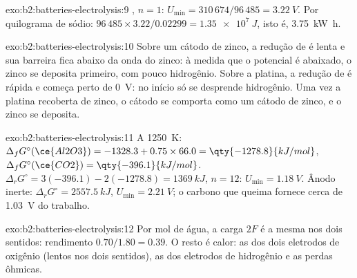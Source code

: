 \begin{solution}{exo:b2:batteries-electrolysis:9}
, $n = 1$: $U_{\min} = 310\,674/96\,485 = \qty{3.22}{V}$.
Por quilograma de sódio: $96\,485 \times 3.22/0.02299 = \qty{1.35e7}{J}$, isto é,
\qty{3.75}{kW.h}.
\end{solution}

\begin{solution}{exo:b2:batteries-electrolysis:10}
Sobre um cátodo de zinco, a redução de  é lenta e sua barreira fica
abaixo da onda do zinco: à medida que o potencial é abaixado, o zinco se
deposita primeiro, com pouco hidrogênio. Sobre a platina, a redução de 
é rápida e começa perto de \qty{0}{V}: no início só se desprende hidrogênio.
Uma vez a platina recoberta de zinco, o cátodo se comporta como um cátodo de
zinco, e o zinco se deposita.
\end{solution}

\begin{solution}{exo:b2:batteries-electrolysis:11}
A \qty{1250}{K}: $\Delta_f G^\circ(\ce{Al2O3}) = -1328.3 + 0.75 \times 66.0 =
\qty{-1278.8}{kJ/mol}$, $\Delta_f G^\circ(\ce{CO2}) = \qty{-396.1}{kJ/mol}$. $\Delta_r G^\circ =
3(-396.1) - 2(-1278.8) = \qty{1369}{kJ}$, $n = 12$: $U_{\min} = \qty{1.18}{V}$. Ânodo inerte:
$\Delta_r G^\circ = \qty{2557.5}{kJ}$, $U_{\min} = \qty{2.21}{V}$; o carbono que
queima fornece cerca de \qty{1.03}{V} do trabalho.
\end{solution}

\begin{solution}{exo:b2:batteries-electrolysis:12}
Por mol de água, a carga $2F$ é a mesma nos dois sentidos: rendimento $0.70/1.80 =
0.39$. O resto é calor: as  dos dois eletrodos de oxigênio (lentos
nos dois sentidos), as dos eletrodos de hidrogênio e as perdas ôhmicas.
\end{solution}

